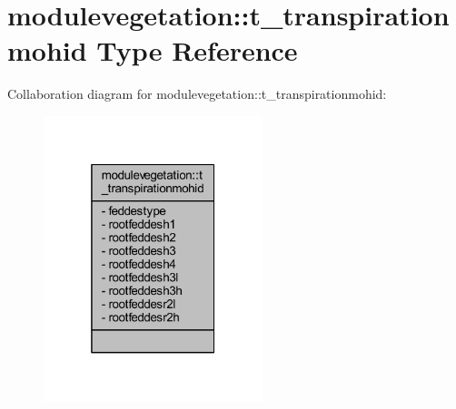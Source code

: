 \hypertarget{structmodulevegetation_1_1t__transpirationmohid}{}\section{modulevegetation\+:\+:t\+\_\+transpirationmohid Type Reference}
\label{structmodulevegetation_1_1t__transpirationmohid}


Collaboration diagram for modulevegetation\+:\+:t\+\_\+transpirationmohid\+:\nopagebreak
\begin{figure}[H]
\begin{center}
\leavevmode
\includegraphics[width=181pt]{structmodulevegetation_1_1t__transpirationmohid__coll__graph}
\end{center}
\end{figure}
